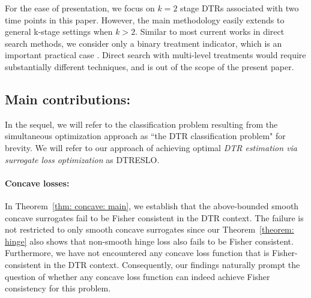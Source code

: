 \documentclass[preprint] {imsart}
\def\purple{\color{purple}}
\def\red{\color{red}}
\newcommand{\tcomm}[1]{\fbox{\bf\scriptsize\purple #1}}
\begin{document}
 


For the ease of presentation, we focus on $k=2$ stage DTRs associated with two time points in this paper. However, the main  methodology easily extends to general k-stage settings when $k> 2$. Similar to most current works in direct search methods, we  consider only a binary treatment indicator, which is an important practical case \citep{laber2017}. Direct search with multi-level treatments would require substantially different techniques, and is out of the scope of the present paper. 

\subsection{Main contributions:}
In the sequel, we will refer to the classification problem resulting from the simultaneous optimization approach as ``the DTR classification problem" for brevity. We will refer to our approach of achieving optimal {\em DTR estimation via surrogate loss optimization} as DTRESLO. 
  \paragraph{Concave losses:}{
 In Theorem~\ref{thm: concave: main}, we establish that the above-bounded smooth concave surrogates fail to be Fisher consistent in the DTR context. The failure is not restricted to only smooth concave surrogates since our Theorem~\ref{theorem: hinge} also shows that  non-smooth hinge loss also fails to be Fisher consistent. 
    Furthermore, we have not encountered any concave loss function that is Fisher-consistent in the DTR context. Consequently, our findings naturally prompt the question of whether any concave loss function can indeed achieve Fisher consistency for this problem.
  }
  
\end{document}
